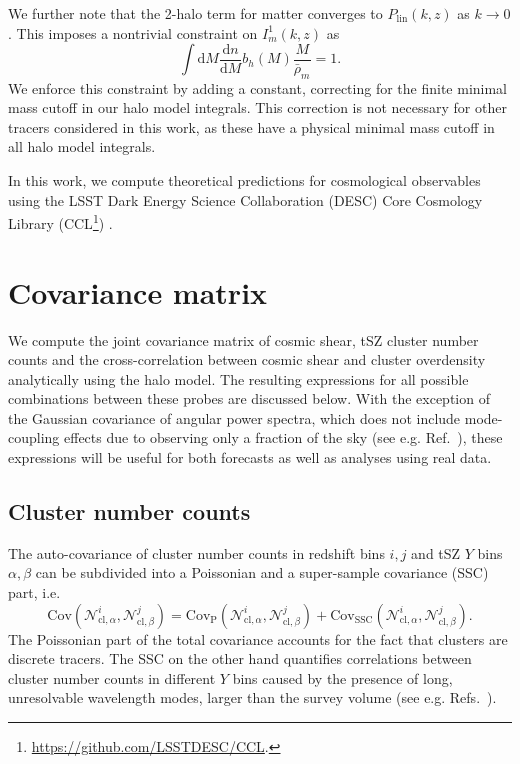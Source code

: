 \documentclass[%
 reprint,
nofootinbib,
 amsmath,amssymb,
 aps,
]{revtex4-1}
\begin{document}
We further note that the 2-halo term for matter converges to $P_{\mathrm{lin}}(k, z)$ as $k \rightarrow 0$. This imposes a nontrivial constraint on $I^{1}_{m}(k, z)$ as
\begin{equation}
\int \mathrm{d}M \frac{\mathrm{d}n}{\mathrm{d}M}b_{h}(M) \frac{M}{\bar{\rho}_{m}} = 1. 
\end{equation}
We enforce this constraint by adding a constant, correcting for the finite minimal mass cutoff in our halo model integrals. This correction is not necessary for other tracers considered in this work, as these have a physical minimal mass cutoff in all halo model integrals.

In this work, we compute theoretical predictions for cosmological observables using the LSST Dark Energy Science Collaboration (DESC) Core Cosmology Library (CCL\footnote{\url{https://github.com/LSSTDESC/CCL}.}) \cite{Chisari:2019}.

\section{Covariance matrix}\label{sec:covariance}

We compute the joint covariance matrix of cosmic shear, tSZ cluster number counts and the cross-correlation between cosmic shear and cluster overdensity analytically using the halo model. The resulting expressions for all possible combinations between these probes are discussed below. With the exception of the Gaussian covariance of angular power spectra, which does not include mode-coupling effects due to observing only a fraction of the sky (see e.g. Ref.~\cite{Garcia:2019}), these expressions will be useful for both forecasts as well as analyses using real data.

\subsection{Cluster number counts}

The auto-covariance of cluster number counts in redshift bins $i, j$ and tSZ $Y$ bins $\alpha, \beta$ can be subdivided into a Poissonian and a super-sample covariance (SSC) part, i.e.
\begin{equation}
\mathrm{Cov}(\mathcal{N}^{i}_{\mathrm{cl}, \alpha} , \mathcal{N}^{j}_{\mathrm{cl}, \beta}) = \mathrm{Cov}_{\mathrm{P}}(\mathcal{N}^{i}_{\mathrm{cl}, \alpha} , \mathcal{N}^{j}_{\mathrm{cl}, \beta}) +  \mathrm{Cov}_{\mathrm{SSC}}(\mathcal{N}^{i}_{\mathrm{cl}, \alpha} , \mathcal{N}^{j}_{\mathrm{cl}, \beta}).
\end{equation} 
The Poissonian part of the total covariance accounts for the fact that clusters are discrete tracers. The SSC on the other hand quantifies correlations between cluster number counts in different $Y$ bins caused by the presence of long, unresolvable wavelength modes, larger than the survey volume (see e.g. Refs.~\cite{Hamilton:2006, Takada:2013}). 
\end{document}
